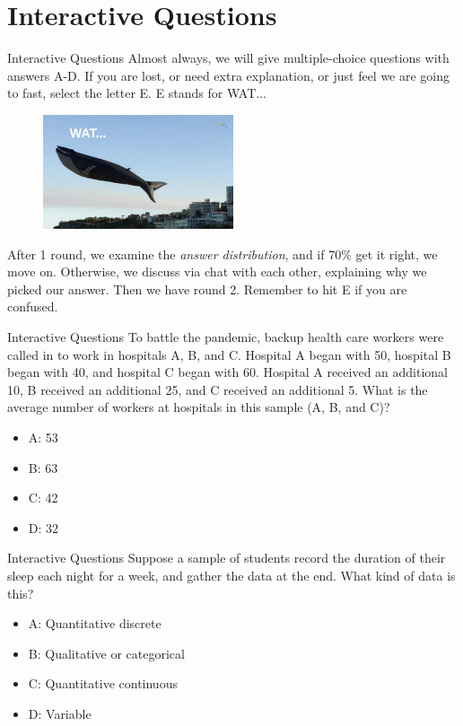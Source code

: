 \documentclass{beamer}
\begin{document}
\section{Interactive Questions}

\begin{frame}{Interactive Questions}
Almost always, we will give multiple-choice questions with answers A-D.  If you are lost, or need extra explanation, or just feel we are going to fast, select the letter E.  E stands for WAT...
\begin{figure}
\includegraphics[width=0.5\textwidth]{figures/wat.pdf}
\end{figure}
After 1 round, we examine the \textit{answer distribution}, and if 70\% get it right, we move on.  Otherwise, we discuss via chat with each other, explaining why we picked our answer.  Then we have round 2.  Remember to hit E if you are confused.
\end{frame}

\begin{frame}{Interactive Questions}
To battle the pandemic, backup health care workers were called in to work in hospitals A, B, and C.  Hospital A began with 50, hospital B began with 40, and hospital C began with 60.  Hospital A received an additional 10, B received an additional 25, and C received an additional 5.  What is the average number of workers at hospitals in this sample (A, B, and C)?
\begin{itemize}
\item A: 53
\item B: 63
\item C: 42
\item D: 32
\end{itemize}
\end{frame}

\begin{frame}{Interactive Questions}
Suppose a sample of students record the duration of their sleep each night for a week, and gather the data at the end.  What kind of data is this?
\begin{itemize}
\item A: Quantitative discrete
\item B: Qualitative or categorical
\item C: Quantitative continuous
\item D: Variable
\end{itemize}
\end{frame}
\end{document}
